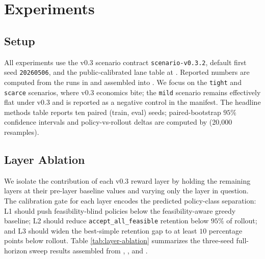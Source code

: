 \documentclass[11pt]{article}
\begin{document}
\section{Experiments}
\label{sec:experiments}

\subsection{Setup}

All experiments use the v0.3 scenario contract
\texttt{scenario-v0.3.2}, default first seed \texttt{20260506}, and the
public-calibrated lane table at
. Reported numbers are
computed from the runs in  and assembled
into . We focus on the \texttt{tight} and
\texttt{scarce} scenarios, where v0.3 economics bite; the \texttt{mild}
scenario remains effectively flat under v0.3 and is reported as a
negative control in the manifest. The headline methods table reports ten
paired (train, eval) seeds; paired-bootstrap $95\%$ confidence intervals
and policy-vs-rollout deltas are computed by
 (20{,}000 resamples).

\subsection{Layer Ablation}

We isolate the contribution of each v0.3 reward layer by holding the
remaining layers at their pre-layer baseline values and varying only the
layer in question. The calibration gate for each layer encodes the
predicted policy-class separation: L1 should push feasibility-blind
policies below the feasibility-aware greedy baseline; L2 should reduce
\texttt{accept\_all\_feasible} retention below $95\%$ of rollout; and
L3 should widen the best-simple retention gap to at least $10$
percentage points below rollout. Table \ref{tab:layer-ablation}
summarizes the three-seed full-horizon sweep results assembled from
,
, and
.
\end{document}
